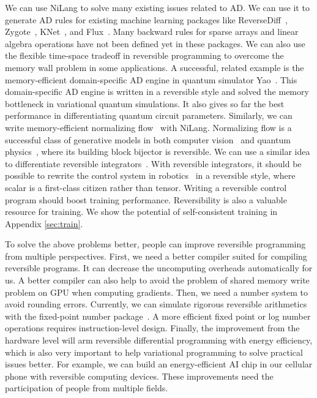 \documentclass{article}
\newcommand{\<}{\langle}
\renewcommand{\>}{\rangle}
\newcommand{\App}[1]{Appendix \ref{#1}}
\newcommand{\orange}[1]{}
\theoremstyle{definition}\newtheorem{definition}{\textit{Definition}}
\begin{document}
We can use NiLang to solve many existing issues related to AD.
We can use it to generate AD rules for existing machine learning packages like ReverseDiff~\cite{ReverseDiff}, Zygote~\cite{Innes2019}, KNet~\cite{KNet}, and Flux~\cite{Innes2018a}.
Many backward rules for sparse arrays and linear algebra operations have not been defined yet in these packages.
We can also use the flexible time-space tradeoff in reversible programming to overcome the memory wall problem in some applications.
A successful, related example is the memory-efficient domain-specific AD engine in quantum simulator Yao~\cite{Luo2019}.
This domain-specific AD engine is written in a reversible style and solved the memory bottleneck in variational quantum simulations. It also gives so far the best performance in differentiating quantum circuit parameters.
Similarly, we can write memory-efficient normalizing flow~\cite{Kobyzev2019} with NiLang. Normalizing flow is a successful class of generative models in both computer vision~\cite{Kingma2018} and quantum physics~\cite{Dinh2016,Li2018}, where its building block bijector is reversible.
We can use a similar idea to differentiate reversible integrators~\cite{Hut1995, Laikov2018}.
With reversible integrators, it should be possible to rewrite the control system in robotics~\cite{Giftthaler2017} in a reversible style, where scalar is a first-class citizen rather than tensor.
Writing a reversible control program should boost training performance.
Reversibility is also a valuable resource for training.
We show the potential of self-consistent training in \App{sec:train}.

To solve the above problems better, people can improve reversible programming from multiple perspectives.\orange{Unless the underlying CPU arch would be reversible, which is not}
First, we need a better compiler suited for compiling reversible programs. It can decrease the uncomputing overheads automatically for us.
A better compiler can also help to avoid the problem of shared memory write problem on GPU when computing gradients.
Then, we need a number system to avoid rounding errors. Currently, we can simulate rigorous reversible arithmetics with the fixed-point number package~\cite{FixedPointNumbers,LogarithmicNumbers}. A more efficient fixed point or log number operations requires instruction-level design.
Finally, the improvement from the hardware level will arm reversible differential programming with energy efficiency, which is also very important to help variational programming to solve practical issues better. For example, we can build an energy-efficient AI chip in our cellular phone with reversible computing devices.
These improvements need the participation of people from multiple fields.
\end{document}

